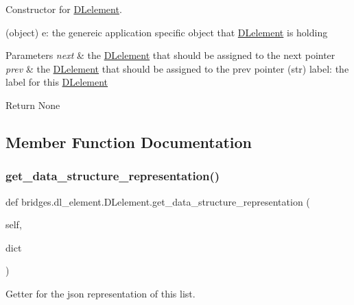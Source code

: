 Constructor for \mbox{\hyperlink{classbridges_1_1dl__element_1_1_d_lelement}{D\+Lelement}}. 

(object) e\+: the genereic application specific object that \mbox{\hyperlink{classbridges_1_1dl__element_1_1_d_lelement}{D\+Lelement}} is holding 
\begin{DoxyParams}{Parameters}
{\em next} & the \mbox{\hyperlink{classbridges_1_1dl__element_1_1_d_lelement}{D\+Lelement}} that should be assigned to the next pointer \\
\hline
{\em prev} & the \mbox{\hyperlink{classbridges_1_1dl__element_1_1_d_lelement}{D\+Lelement}} that should be assigned to the prev pointer (str) label\+: the label for this \mbox{\hyperlink{classbridges_1_1dl__element_1_1_d_lelement}{D\+Lelement}} \\
\hline
\end{DoxyParams}
\begin{DoxyParagraph}{Return}
None 
\end{DoxyParagraph}


\subsection{Member Function Documentation}
\mbox{\label{classbridges_1_1dl__element_1_1_d_lelement_abcae653ca8e9590c594910bad148ddf2}} 
\subsubsection{\texorpdfstring{get\+\_\+data\+\_\+structure\+\_\+representation()}{get\_data\_structure\_representation()}}
{\footnotesize\ttfamily def bridges.\+dl\+\_\+element.\+D\+Lelement.\+get\+\_\+data\+\_\+structure\+\_\+representation (\begin{DoxyParamCaption}\item[{}]{self,  }\item[{}]{dict }\end{DoxyParamCaption})}



Getter for the json representation of this list. 


